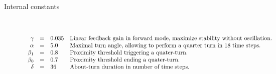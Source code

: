 \documentclass[a4]{article} \usepackage[left=2cm,right=3cm,top=1cm,bottom=2cm]{geometry}
\newcommand{\eqline}[1]{~\vspace{0.1cm}\\\centerline{$#1$}\vspace{0.1cm}\\}
\begin{document}
\begin{description}
\item[Internal constants]  \eqline{\begin{array}{rcll}
    \gamma &=& 0.035 & \mbox{\parbox{12cm}{Linear feedback gain in forward mode, maximize stability without oscillation.}} \\
    \alpha    &=& 5.0 & \mbox{\parbox{12cm}{Maximal turn angle, allowing to perform a quarter turn in $18$ time steps.}} \\
    \beta_1   &=& 0.8 & \mbox{\parbox{12cm}{Proximity threshold triggering a quater-turn.}} \\
    \beta_0   &=& 0.7 & \mbox{\parbox{12cm}{Proximity threshold ending a quater-turn.}} \\
    \delta    &=& 36 & \mbox{\parbox{12cm}{About-turn duration in number of time steps.}} \\
\end{array}}
  

\end{description}
\end{document}
